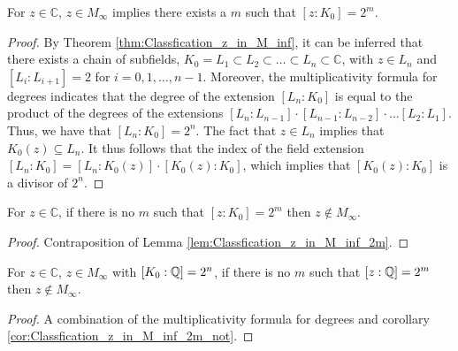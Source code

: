 \begin{lemma}
    \label{lem:Classfication_z_in_M_inf_2m}
    \leanok
    For $z \in \mathbb{C}$, $z \in M_{\infty}$ implies there exists a $m$ such that $[z:K_0] = 2^m$.
\end{lemma}

\begin{proof}
    \leanok
    By Theorem \ref{thm:Classfication_z_in_M_inf}, it can be inferred that there exists a chain of subfields, $K_0 = L_1 \subset L_2 \subset \dots \subset L_n \subset \mathbb{C}$, with $z \in L_n$ and $[L_i : L_{i+1}] = 2$ for $i = 0, 1, \dots, n-1$. 
    Moreover, the multiplicativity formula for degrees indicates that the degree of the extension $[L_n : K_0]$ is equal to the product of the degrees of the extensions $[L_n : L_{n-1}] \cdot [L_{n-1} : L_{n-2}] \cdot \dots [L_2 : L_1]$.
    Thus, we have that $[L_n : K_0] = 2^n$. 
    The fact that $z\in L_n$ implies that $K_0(z)\subseteq L_n$. 
    It thus follows that the index of the field extension $[L_n : K_0] = [L_n : K_0(z)]\cdot [K_0(z) : K_0]$, which implies that $[K_0(z) : K_0]$ is a divisor of $2^n$. 
\end{proof}

\begin{corollary}
    \label{cor:Classfication_z_in_M_inf_2m_not}
    \leanok
    For $z \in \mathbb{C}$, if there is no $m$ such that $[z:K_0] = 2^m$ then $z \notin M_{\infty}$.
\end{corollary}

\begin{proof}
    \leanok
    Contraposition of Lemma \ref{lem:Classfication_z_in_M_inf_2m}.
\end{proof}

\begin{corollary}
    \label{cor:Classfication_z_in_M_inf_2m_rat}
    \leanok
    For $z \in \mathbb{C}$, $z \in M_{\infty}$ with $[K_0:\mathbb{Q}] = 2^n$,  if there is no $m$ such that $[z:\mathbb{Q}] = 2^m$ then $z \notin M_{\infty}$.
\end{corollary}

\begin{proof}
    \leanok
    A combination of the multiplicativity formula for degrees and corollary \ref{cor:Classfication_z_in_M_inf_2m_not}.
\end{proof}
